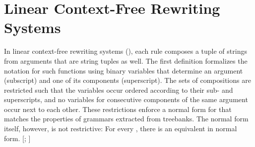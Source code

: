 \documentclass[../../document.tex]{subfiles}
\begin{document}
    \section{Linear Context-Free Rewriting Systems}\label{sec:grammar:lcfrs}
    In linear context-free rewriting systems (), each rule composes a tuple of strings from arguments that are string tuples as well.
    The first definition formalizes the notation for such functions using binary variables that determine an argument (subscript) and one of its components (superscript).
    The sets of compositions are restricted such that the variables occur ordered according to their sub- and superscripts, and no variables for consecutive components of the same argument occur next to each other.
    These restrictions enforce a normal form for  that matches the properties of grammars extracted from treebanks.
    The normal form itself, however, is not restrictive: For every , there is an equivalent  in normal form. [\citealp[Lem.~2.2]{SekMatFujKas91}; \citealp[Def.~7.2]{Kal10}]
\end{document}
